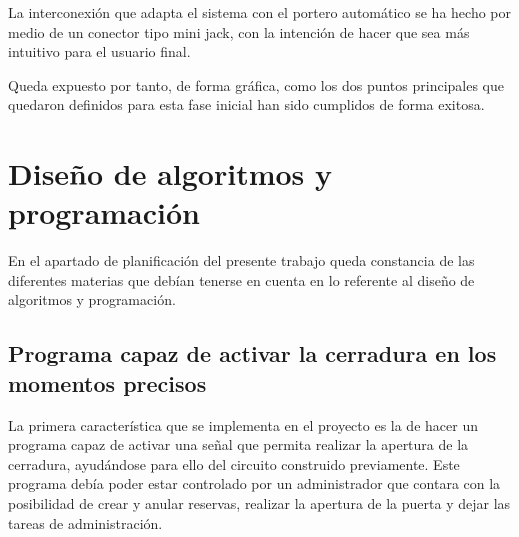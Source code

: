 La interconexión que adapta el sistema con el portero automático se ha hecho por medio de un conector tipo mini jack, con la intención de hacer que sea más intuitivo para el usuario final.

Queda expuesto por tanto, de forma gráfica, como los dos puntos principales que quedaron definidos para esta fase inicial han sido cumplidos de forma exitosa.

\section{Diseño de algoritmos y programación}
En el apartado de planificación del presente trabajo queda constancia de las diferentes materias que debían tenerse en cuenta en lo referente al diseño de algoritmos y programación.

\subsection{Programa capaz de activar la cerradura en los momentos precisos}

La primera característica que se implementa en el proyecto es la de hacer un programa capaz de activar una señal que permita realizar la apertura de la cerradura, ayudándose para ello del circuito construido previamente. Este programa debía poder estar controlado por un administrador que contara con la posibilidad de crear y anular reservas, realizar la apertura de la puerta y dejar las tareas de administración.

